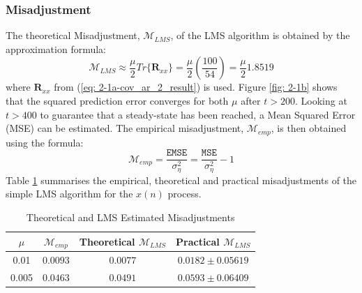 \documentclass[12pt]{article}
\numberwithin{equation}{section}
\begin{document}
		\subsubsection{Misadjustment}
			
			The theoretical Misadjustment, $\mathcal{M}_{LMS}$, of the LMS algorithm is obtained by the approximation formula:
			\vspace*{-0.6\baselineskip}
			\begin{equation}
			\mathcal{M}_{LMS} \approx \frac{\mu}{2} Tr\big\{ \mathbf{R}_{xx} \big\} = \frac{\mu}{2} \left(\frac{100}{54}\right) = \frac{\mu}{2} 1.8519
			\end{equation}
			\indent
			where $\mathbf{R}_{xx}$ from (\ref{eq: 2-1a-cov_ar_2_result}) is used. \newline
			\noindent
			Figure \ref{fig: 2-1b} shows that the squared prediction error converges for both $\mu$ after $t > 200$. Looking at $t > 400$ to guarantee that a steady-state has been reached, a Mean Squared Error (MSE) can be estimated. The empirical misadjustment, $\mathcal{M}_{emp}$, is then obtained using the formula:
			\begin{equation}
			\mathcal{M}_{emp} = \frac{\mathtt{EMSE}}{\sigma_{\eta}^{2}} = \frac{\mathtt{MSE}}{\sigma_{\eta}^{2}} -1
			\end{equation}
			\noindent
			Table \ref{tab: 2-1c} summarises the empirical, theoretical and practical misadjustments of the simple LMS algorithm for the $x(n)$ process.
						
			\begin{table}[H]
				\centering
				\begin{tabular}{|c|c|c||c|}
					\hline
					\textbf{$\mu$} & \textbf{$\mathcal{M}_{emp}$} & Theoretical \textbf{$\mathcal{M}_{LMS}$} & Practical \textbf{$\mathcal{M}_{LMS}$} \\
					\hline
					0.01 & $0.0093$ & $0.0077$ & $0.0182 \pm 0.05619$ \\
					\hline
					0.005 & $0.0463$ & $0.0491$ & $0.0593 \pm 0.06409$ \\
					\hline
				\end{tabular}
				\captionsetup{justification=centering}
				\caption{Theoretical and LMS Estimated Misadjustments}
				\label{tab: 2-1c}
			\end{table}
		
\end{document}
